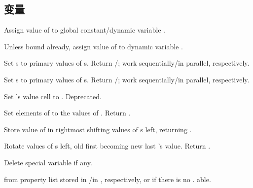 \subsection{变量}

\begin{LIST}{1cm}

  {
  Assign value of  to global constant/dynamic variable .
  }

  {
  Unless bound already, assign value of  to dynamic variable
  . 
  }

  {
  Set s to primary values of s. Return /\retval{\NIL}; work sequentially/in parallel, respectively. 
  }

  {
  Set s to primary values of s. Return /\retval{\NIL}; work sequentially/in parallel, respectively. 
  }

  {
  Set 's value cell to . Deprecated.
  }

  {
  Set elements of  to the values of
  . Return .
  }

  {
  Store value of  in rightmost  shifting values of
  s left, returning . 
  }

  {
  Rotate values of s left, old first becoming new last
  's value. Return \retval{\NIL}.
  }

  {
  Delete special variable  if any.
  }

  \label{:property_lists}
  {
   from property list stored in
  /in , respectively, or  if
  there is no . able.
  }


\end{LIST}
